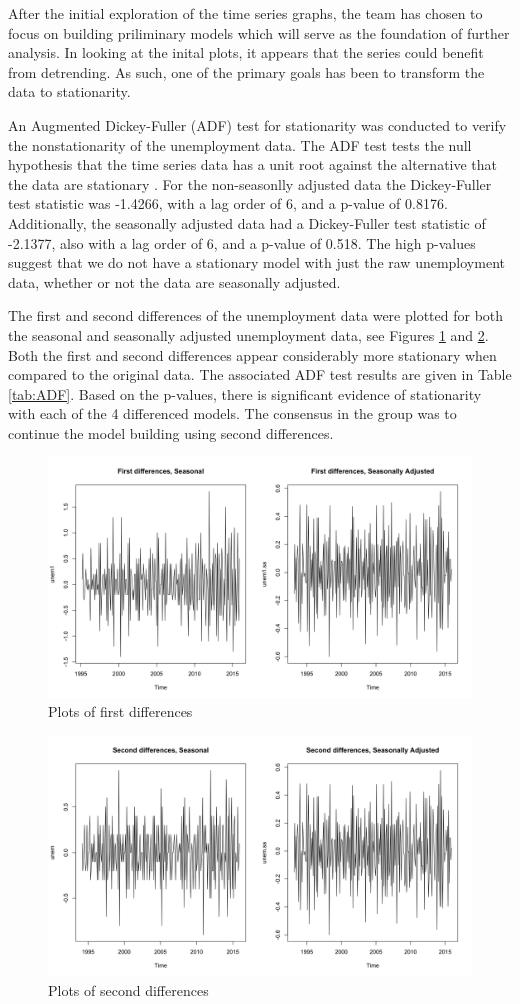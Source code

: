 {			After the initial exploration of the time series graphs, the team has chosen to focus on building priliminary models which will serve as the foundation of further analysis. In looking at the inital plots, it appears that the series could benefit from detrending. As such, one of the primary goals has been to transform the data to stationarity. 
			
			An Augmented Dickey-Fuller (ADF) test for stationarity was conducted to verify the nonstationarity of the unemployment data.  The ADF test tests the null hypothesis that the time series data has a unit root against the alternative that the data are stationary \citep{Shumway2006}. For the non-seasonlly adjusted data the Dickey-Fuller test statistic was -1.4266, with a lag order of 6, and a p-value of 0.8176. Additionally, the seasonally adjusted data had a Dickey-Fuller test statistic of -2.1377, also with a lag order of 6, and a p-value of 0.518. The high p-values suggest that we do not have a stationary model with just the raw unemployment data, whether or not the data are seasonally adjusted.
			
		 The first and second differences of the unemployment data were plotted for both the seasonal and seasonally adjusted unemployment data, see Figures \ref{fig:firstdiff} and \ref{fig:secdiff}. Both the first and second differences appear considerably more stationary when compared to the original data. The associated ADF test results are given in Table \ref{tab:ADF}. Based on the p-values, there is significant evidence of stationarity with each of the 4 differenced models. The consensus in the group was to continue the model building using second differences.
		 
	
		 \begin{figure}[H]
							\centering
							\includegraphics[width=.6\linewidth]{images/firstdiff}
							\caption{Plots of first differences}
							\label{fig:firstdiff}
						\end{figure}
						
								 \begin{figure}[H]
							\centering
							\includegraphics[width=.6\linewidth]{images/secdiff}
							\caption{Plots of second differences}
							\label{fig:secdiff}
						\end{figure}

}
